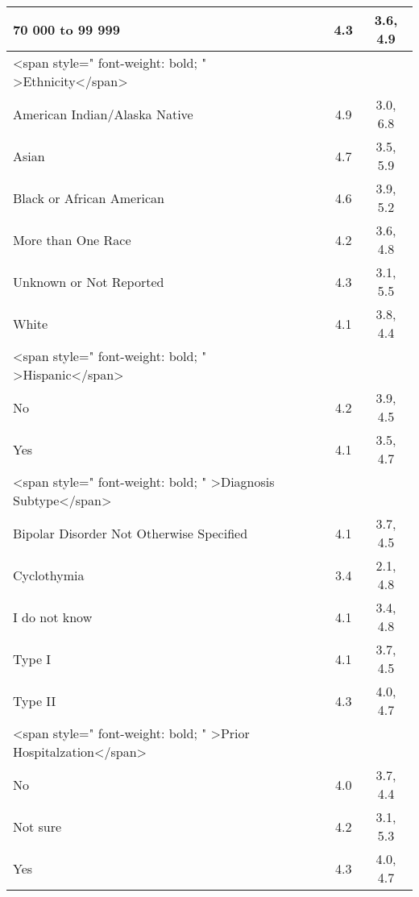 \documentclass[border=1mm]{standalone}
\begin{document}
\begin{tabular}{l|c|c}
\hline
\hspace{1em}70 000 to 99 999 & 4.3 & 3.6, 4.9\\
\hline
<span style=" font-weight: bold;    " >Ethnicity</span> &  & \\
\hline
\hspace{1em}American Indian/Alaska Native & 4.9 & 3.0, 6.8\\
\hline
\hspace{1em}Asian & 4.7 & 3.5, 5.9\\
\hline
\hspace{1em}Black or African American & 4.6 & 3.9, 5.2\\
\hline
\hspace{1em}More than One Race & 4.2 & 3.6, 4.8\\
\hline
\hspace{1em}Unknown or Not Reported & 4.3 & 3.1, 5.5\\
\hline
\hspace{1em}White & 4.1 & 3.8, 4.4\\
\hline
<span style=" font-weight: bold;    " >Hispanic</span> &  & \\
\hline
\hspace{1em}No & 4.2 & 3.9, 4.5\\
\hline
\hspace{1em}Yes & 4.1 & 3.5, 4.7\\
\hline
<span style=" font-weight: bold;    " >Diagnosis Subtype</span> &  & \\
\hline
\hspace{1em}Bipolar Disorder Not Otherwise Specified & 4.1 & 3.7, 4.5\\
\hline
\hspace{1em}Cyclothymia & 3.4 & 2.1, 4.8\\
\hline
\hspace{1em}I do not know & 4.1 & 3.4, 4.8\\
\hline
\hspace{1em}Type I & 4.1 & 3.7, 4.5\\
\hline
\hspace{1em}Type II & 4.3 & 4.0, 4.7\\
\hline
<span style=" font-weight: bold;    " >Prior Hospitalzation</span> &  & \\
\hline
\hspace{1em}No & 4.0 & 3.7, 4.4\\
\hline
\hspace{1em}Not sure & 4.2 & 3.1, 5.3\\
\hline
\hspace{1em}Yes & 4.3 & 4.0, 4.7\\

\end{tabular}
\end{document}
